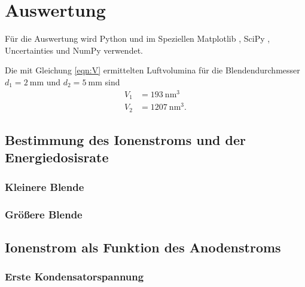 \section{Auswertung}
\label{sec:Auswertung}

Für die Auswertung wird Python und im Speziellen
Matplotlib \cite{matplotlib}, SciPy \cite{scipy},
Uncertainties \cite{uncertainties} und NumPy \cite{numpy} verwendet.

\noindent Die mit Gleichung \eqref{eqn:V} ermittelten Luftvolumina
für die Blendendurchmesser $d_1 = \SI{2}{\milli\meter}$ und
$d_2 = \SI{5}{\milli\meter}$ sind
\begin{align*}
    V_1 &= \SI{193}{\nano\meter\cubed} \\
    V_2 &= \SI{1207}{\nano\meter\cubed}.
\end{align*}


\subsection{Bestimmung des Ionenstroms und der Energiedosisrate}

\subsubsection{Kleinere Blende}



\subsubsection{Größere Blende}




\subsection{Ionenstrom als Funktion des Anodenstroms}

\subsubsection{Erste Kondensatorspannung}

